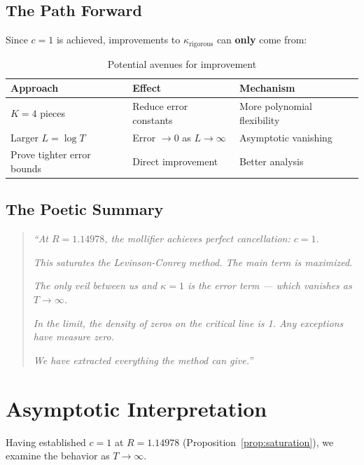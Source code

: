 \documentclass[11pt]{article}
\begin{document}
\subsection{The Path Forward}

Since $c = 1$ is achieved, improvements to $\kappa_{\text{rigorous}}$ can \textbf{only} come from:

\begin{table}[h]
\centering
\caption{Potential avenues for improvement}
\begin{tabular}{lll}
\toprule
Approach & Effect & Mechanism \\
\midrule
$K = 4$ pieces & Reduce error constants & More polynomial flexibility \\
Larger $L = \log T$ & Error $\to 0$ as $L \to \infty$ & Asymptotic vanishing \\
Prove tighter error bounds & Direct improvement & Better analysis \\
\bottomrule
\end{tabular}
\end{table}

\subsection{The Poetic Summary}

\begin{quotation}
\textit{``At $R = 1.14978$, the mollifier achieves perfect cancellation: $c = 1$.}

\textit{This saturates the Levinson-Conrey method. The main term is maximized.}

\textit{The only veil between us and $\kappa = 1$ is the error term --- which vanishes as $T \to \infty$.}

\textit{In the limit, the density of zeros on the critical line is 1. Any exceptions have measure zero.}

\textit{We have extracted everything the method can give.''}
\end{quotation}

\section{Asymptotic Interpretation}
\label{sec:asymptotic}

Having established $c = 1$ at $R = 1.14978$ (Proposition~\ref{prop:saturation}), we examine the behavior as $T \to \infty$.
\end{document}
